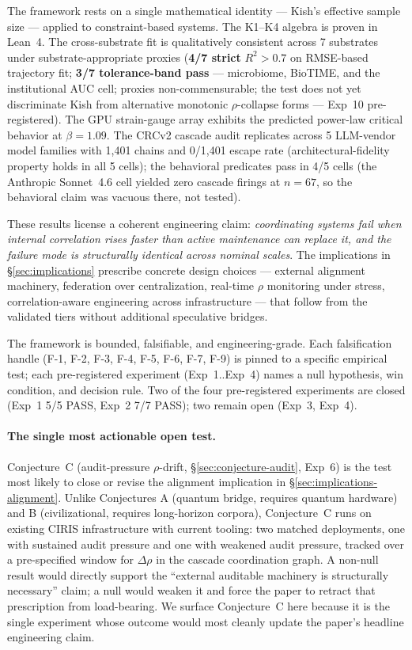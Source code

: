 \documentclass[11pt,a4paper]{article}
\begin{document}
The framework rests on a single mathematical identity --- Kish's effective sample size --- applied to constraint-based systems. The K1--K4 algebra is proven in Lean~4. The cross-substrate fit is qualitatively consistent across 7 substrates under substrate-appropriate proxies (\textbf{4/7 strict} $R^2 > 0.7$ on RMSE-based trajectory fit; \textbf{3/7 tolerance-band pass} --- microbiome, BioTIME, and the institutional AUC cell; proxies non-commensurable; the test does not yet discriminate Kish from alternative monotonic $\rho$-collapse forms --- Exp~10 pre-registered). The GPU strain-gauge array exhibits the predicted power-law critical behavior at $\beta = 1.09$. The CRCv2 cascade audit replicates across 5 LLM-vendor model families with 1,401 chains and 0/1,401 escape rate (architectural-fidelity property holds in all 5 cells); the behavioral predicates pass in 4/5 cells (the Anthropic Sonnet~4.6 cell yielded zero cascade firings at $n=67$, so the behavioral claim was vacuous there, not tested).

These results license a coherent engineering claim: \emph{coordinating systems fail when internal correlation rises faster than active maintenance can replace it, and the failure mode is structurally identical across nominal scales}. The implications in \S\ref{sec:implications} prescribe concrete design choices --- external alignment machinery, federation over centralization, real-time $\rho$ monitoring under stress, correlation-aware engineering across infrastructure --- that follow from the validated tiers without additional speculative bridges.

The framework is bounded, falsifiable, and engineering-grade. Each falsification handle (F-1, F-2, F-3, F-4, F-5, F-6, F-7, F-9) is pinned to a specific empirical test; each pre-registered experiment (Exp~1..Exp~4) names a null hypothesis, win condition, and decision rule. Two of the four pre-registered experiments are closed (Exp~1 5/5 PASS, Exp~2 7/7 PASS); two remain open (Exp~3, Exp~4).

\paragraph{The single most actionable open test.} Conjecture~C (audit-pressure $\rho$-drift, \S\ref{sec:conjecture-audit}, Exp~6) is the test most likely to close or revise the alignment implication in \S\ref{sec:implications-alignment}. Unlike Conjectures A (quantum bridge, requires quantum hardware) and B (civilizational, requires long-horizon corpora), Conjecture~C runs on existing CIRIS infrastructure with current tooling: two matched deployments, one with sustained audit pressure and one with weakened audit pressure, tracked over a pre-specified window for $\Delta \rho$ in the cascade coordination graph. A non-null result would directly support the ``external auditable machinery is structurally necessary'' claim; a null would weaken it and force the paper to retract that prescription from load-bearing. We surface Conjecture~C here because it is the single experiment whose outcome would most cleanly update the paper's headline engineering claim.
\end{document}
